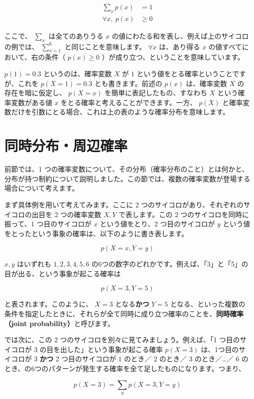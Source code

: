 \begin{align}
\sum_x p(x) &= 1 \\
\forall x, \ p(x) & \geq  0
\end{align}


ここで、 $\sum_x$ は全てのありうる $x$ の値にわたる和を表し、例えば上のサイコロの例では、 $\sum_{x=1}^6$ と同じことを意味します。 $\forall x$ は、あり得る $x$ の値すべてにおいて、右の条件（ $p(x) \geq 0$ ）が成り立つ、ということを意味しています。


$p(1) = 0.3$ というのは、確率変数 $X$ が $1$ という値をとる確率ということですが、これを $p(X = 1) = 0.3$ とも書きます。前述の $p(x)$ は、確率変数 $X$ の存在を暗に仮定し、 $p(X = x)$ を簡単に表記したもの、すなわち $X$ という確率変数がある値 $x$ をとる確率と考えることができます。一方、 $p(X)$ と確率変数だけを引数にとる場合、これは上の表のような確率分布を意味します。


\section{同時分布・周辺確率}


前節では、1 つの確率変数について、その分布（確率分布のこと）とは何かと、分布が持つ制約について説明しました。この節では、複数の確率変数が登場する場合について考えます。


まず具体例を用いて考えてみます。ここに 2 つのサイコロがあり、それぞれのサイコロの出目を 2 つの確率変数 $X, Y$ で表します。この 2 つのサイコロを同時に振って、1 つ目のサイコロが $x$ という値をとり、2 つ目のサイコロが $y$ という値をとったという事象の確率は、以下のように書き表します。


\[
p(X = x, Y = y)
\]


 $x, y$ はいずれも $1, 2, 3, 4, 5, 6$ の6つの数字のどれかです。例えば、「3」と「5」の目が出る、という事象が起こる確率は


\[
p(X = 3, Y = 5)
\]


と表されます。このように、 $X = 3$ となる\textbf{かつ} $Y = 5$ となる、といった複数の条件を指定したときに、それらが全て同時に成り立つ確率のことを、\textbf{同時確率（joint probability）}と呼びます。


では次に、この 2 つのサイコロを別々に見てみましょう。例えば、「1 つ目のサイコロが $3$ の目を出した」という事象が起こる確率 $p(X = 3)$ は、1つ目のサイコロが $3$ \textbf{かつ} 2 つ目のサイコロが $1$ のとき／ $2$ のとき／ $3$ のとき／…／ $6$ のとき、の6つのパターンが発生する確率を全て足したものになります。つまり、


\[
p(X = 3) = \sum_y p(X = 3, Y = y)
\]


